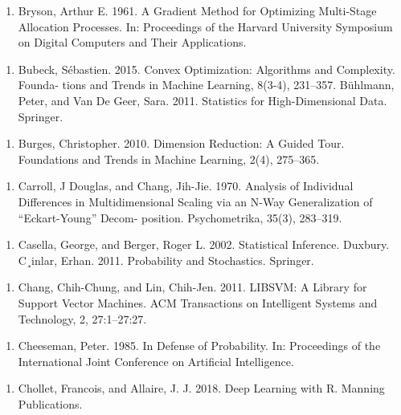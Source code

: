 \begin{enumerate}
\item Bryson, Arthur E. 1961. A Gradient Method for Optimizing Multi-Stage Allocation Processes. In: Proceedings of the Harvard University Symposium on Digital Computers and Their Applications.
\end{enumerate}

\begin{enumerate}
\item Bubeck, Sébastien. 2015. Convex Optimization: Algorithms and Complexity. Founda- tions and Trends in Machine Learning, 8(3-4), 231–357. Bühlmann, Peter, and Van De Geer, Sara. 2011. Statistics for High-Dimensional Data. Springer.
\end{enumerate}

\begin{enumerate}
\item Burges, Christopher. 2010. Dimension Reduction: A Guided Tour. Foundations and Trends in Machine Learning, 2(4), 275–365.
\end{enumerate}

\begin{enumerate}
\item Carroll, J Douglas, and Chang, Jih-Jie. 1970. Analysis of Individual Differences in Multidimensional Scaling via an N-Way Generalization of “Eckart-Young” Decom- position. Psychometrika, 35(3), 283–319.
\end{enumerate}

\begin{enumerate}
\item Casella, George, and Berger, Roger L. 2002. Statistical Inference. Duxbury. C¸inlar, Erhan. 2011. Probability and Stochastics. Springer.
\end{enumerate}

\begin{enumerate}
\item Chang, Chih-Chung, and Lin, Chih-Jen. 2011. LIBSVM: A Library for Support Vector Machines. ACM Transactions on Intelligent Systems and Technology, 2, 27:1–27:27.
\end{enumerate}

\begin{enumerate}
\item Cheeseman, Peter. 1985. In Defense of Probability. In: Proceedings of the International Joint Conference on Artiﬁcial Intelligence.
\end{enumerate}

\begin{enumerate}
\item Chollet, Francois, and Allaire, J. J. 2018. Deep Learning with R. Manning Publications.
\end{enumerate}

